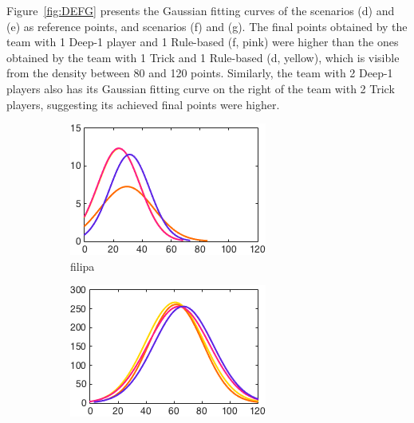 Figure~\ref{fig:DEFG} presents the Gaussian fitting curves of the scenarios (d) and (e) as reference points, and scenarios (f) and (g).
The final points obtained by the team with 1 Deep-1 player and 1 Rule-based (f, pink) were higher than the ones obtained by the team with 1 Trick and 1 Rule-based (d, yellow), which is visible from the density between 80 and 120 points.
Similarly, the team with 2 Deep-1 players also has its Gaussian fitting curve on the right of the team with 2 Trick players, suggesting its achieved final points were higher.

\begin{figure}[h]
        \centering
        \begin{subfigure}[h]{0.32\textwidth}
                \includegraphics[width=\textwidth]{./img/4/DEFGhard}
                \caption{filipa}
                \label{fig:DEFGhard}
        \end{subfigure}
        \begin{subfigure}[h]{0.32\textwidth}
                \includegraphics[width=\textwidth]{./img/4/DEFGmedium}

\end{subfigure}
\end{figure}
